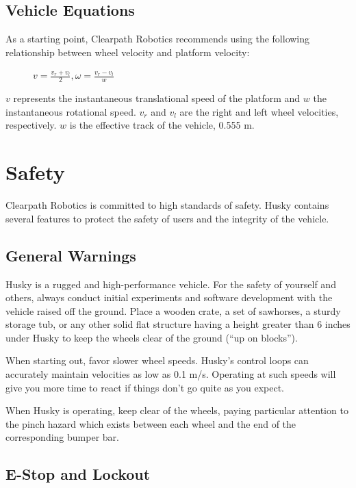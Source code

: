 \documentclass[]{clearpath-latex/clearpath-manual}
\begin{document}
\newpage
\subsection{Vehicle Equations}

As a starting point, Clearpath Robotics recommends using the following relationship between wheel velocity and platform velocity:
\begin{figure}[h]
\centering
$v=\frac{v_r+v_l}{2} , \omega=\frac{v_r-v_l}{w}$
\end{figure}

$v$ represents the instantaneous translational speed of the platform and $w$ the instantaneous rotational speed. $v_r$ and $v_l$ are
the right and left wheel velocities, respectively. $w$ is the effective track of the vehicle, 0.555 m.

\section{Safety}
Clearpath Robotics is committed to high standards of safety. Husky contains several features to protect the safety of users and the integrity of the vehicle.

\subsection{General Warnings}

Husky is a rugged and high-performance vehicle. For the safety of yourself and others,
always conduct initial experiments and software development with the vehicle raised off the ground.
Place a wooden crate, a set of sawhorses, a sturdy storage tub, or any other solid flat structure having a
height greater than 6 inches under Husky to keep the wheels clear of the ground (“up on blocks”).

When starting out, favor slower wheel speeds. Husky’s control loops can accurately maintain velocities
as low as 0.1 m/s. Operating at such speeds will give you more time to react if things don’t go quite as you expect.

When Husky is operating, keep clear of the wheels, paying particular attention to the pinch hazard which exists between each wheel and the end of the corresponding bumper bar.

\subsection{E-Stop and Lockout}
\end{document}
